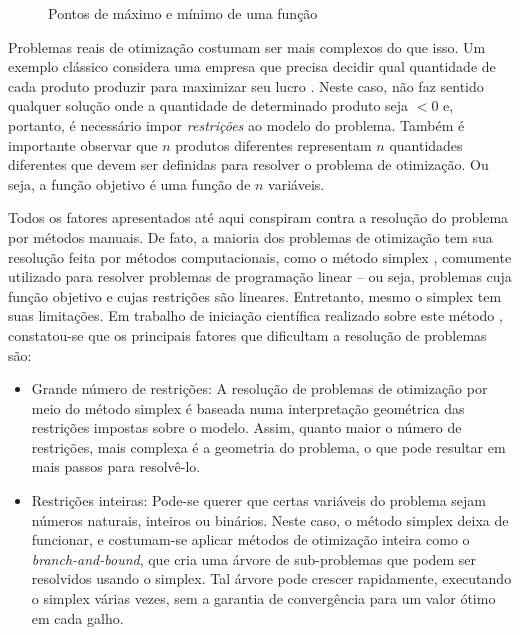 \begin{figure}[ht]
    \centering
    \caption{Pontos de máximo e mínimo de uma função}
    \label{fig:maxmin exemplo}
\end{figure}

Problemas reais de otimização costumam ser mais complexos do que isso. Um exemplo clássico considera uma empresa que precisa decidir qual quantidade de cada produto produzir para maximizar seu lucro \cite{ZHANG2020}. Neste caso, não faz sentido qualquer solução onde a quantidade de determinado produto seja $< 0$ e, portanto, é necessário impor \emph{restrições} ao modelo do problema. Também é importante observar que $n$ produtos diferentes representam $n$ quantidades diferentes que devem ser definidas para resolver o problema de otimização. Ou seja, a função objetivo é uma função de $n$ variáveis.

Todos os fatores apresentados até aqui conspiram contra a resolução do problema por métodos manuais. De fato, a maioria dos problemas de otimização tem sua resolução feita por métodos computacionais, como o método simplex \cite{BAZARAA2010,BERTSIMAS1997}, comumente utilizado para resolver problemas de programação linear -- ou seja, problemas cuja função objetivo e cujas restrições são lineares. Entretanto, mesmo o simplex tem suas limitações. Em trabalho de iniciação científica realizado sobre este método \cite{CENTENARO2023}, constatou-se que os principais fatores que dificultam a resolução de problemas são:

\begin{itemize}
    \item Grande número de restrições: A resolução de problemas de otimização por meio do método simplex é baseada numa interpretação geométrica das restrições impostas sobre o modelo. Assim, quanto maior o número de restrições, mais complexa é a geometria do problema, o que pode resultar em mais passos para resolvê-lo.
    \item Restrições inteiras: Pode-se querer que certas variáveis do problema sejam números naturais, inteiros ou binários. Neste caso, o método simplex deixa de funcionar, e costumam-se aplicar métodos de otimização inteira como o \emph{branch-and-bound}, que cria uma árvore de sub-problemas que podem ser resolvidos usando o simplex. Tal árvore pode crescer rapidamente, executando o simplex várias vezes, sem a garantia de convergência para um valor ótimo em cada galho.
\end{itemize}

